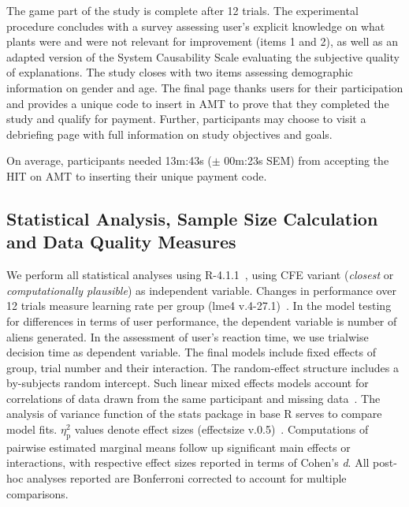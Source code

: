 The game part of the study is complete after 12 trials.
The experimental procedure concludes with a survey assessing user's explicit knowledge on what plants were and were not relevant for improvement (items 1 and 2), as well as an adapted version of the System Causability Scale \cite{holzinger_measuring_2020} evaluating the subjective quality of explanations.
The study closes with two items assessing demographic information on gender and age.
The final page thanks users for their participation and provides a unique code to insert in \gls{AMT} to prove that they completed the study and qualify for payment. 
Further, participants may choose to visit a debriefing page with full information on study objectives and goals. 

On average, participants needed 13m:43s ($\pm$ 00m:23s SEM) from accepting the HIT on AMT to inserting their unique payment code.

\subsection{Statistical Analysis, Sample Size Calculation and Data Quality Measures}

We perform all statistical analyses using R-4.1.1~\citep{r_core_team_r_2021}, using \gls{CFE} variant (\textit{closest} or \textit{computationally plausible}) as independent variable.
Changes in performance over 12 trials measure learning rate per group (lme4 v.4-27.1)~\citep{bates_fitting_2015}.
In the model testing for differences in terms of user performance, the dependent variable is number of aliens generated. 
In the assessment of user's reaction time, we use trialwise decision time as dependent variable.
The final models include fixed effects of group, trial number and their interaction. The random-effect structure includes a by-subjects random intercept. 
Such linear mixed effects models account for correlations of data drawn from the same participant and missing data~\citep{detry_analyzing_2016,muth_alternative_2016}.
The analysis of variance function of the stats package in base R serves to compare model fits.
$\eta_{\text{p}}^{2}$ values denote effect sizes (effectsize v.0.5)~\citep{ben-shachar_effectsize_2020}.
Computations of pairwise estimated marginal means follow up significant main effects or interactions, with respective effect sizes reported in terms of Cohen's \textit{d}.
All post-hoc analyses reported are Bonferroni corrected to account for multiple comparisons.

